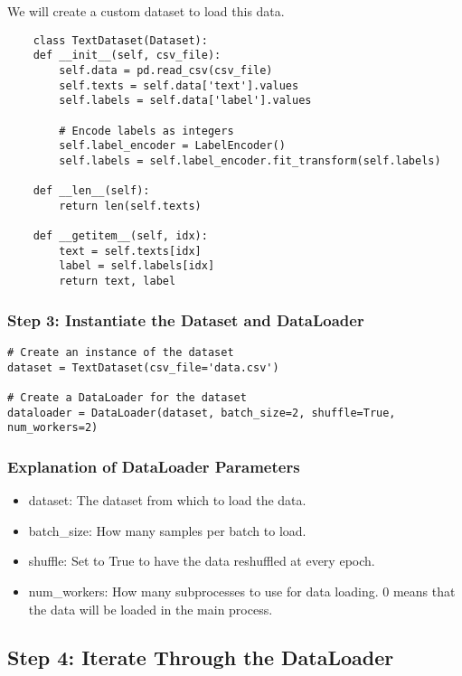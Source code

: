\documentclass{article}
\begin{document}
We will create a custom dataset to load this data.

\begin{lstlisting}
    class TextDataset(Dataset):
    def __init__(self, csv_file):
        self.data = pd.read_csv(csv_file)
        self.texts = self.data['text'].values
        self.labels = self.data['label'].values
        
        # Encode labels as integers
        self.label_encoder = LabelEncoder()
        self.labels = self.label_encoder.fit_transform(self.labels)

    def __len__(self):
        return len(self.texts)

    def __getitem__(self, idx):
        text = self.texts[idx]
        label = self.labels[idx]
        return text, label

\end{lstlisting}

\subsubsection{Step 3: Instantiate the Dataset and DataLoader}

\begin{lstlisting}
# Create an instance of the dataset
dataset = TextDataset(csv_file='data.csv')

# Create a DataLoader for the dataset
dataloader = DataLoader(dataset, batch_size=2, shuffle=True, num_workers=2)

\end{lstlisting}

\subsubsection{Explanation of DataLoader Parameters}

\begin{itemize}
    \item dataset: The dataset from which to load the data.
    \item batch\_size: How many samples per batch to load.
    \item shuffle: Set to True to have the data reshuffled at every epoch.
    \item num\_workers: How many subprocesses to use for data loading. 0 means that the data will be loaded in the main process.
\end{itemize}

\subsection{Step 4: Iterate Through the DataLoader}
\end{document}
